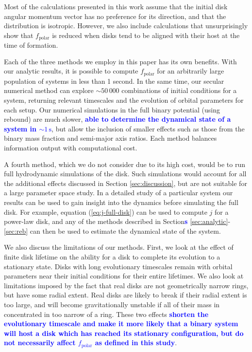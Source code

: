 \documentclass[twocolumn,linenumbers]{aastex631}
\newcommand{\RR}[1]{\textcolor{blue}{\bf#1}} %
\begin{document}
Most of the calculations presented in this work assume that the initial disk angular momentum vector has no preference for its direction, and that the distribution is isotropic. However, we also include calculations that unsurprisingly show that $f_\text{polar}$ is reduced when disks tend to be aligned with their host at the time of formation.

Each of the three methods we employ in this paper has its own benefits. With our analytic results, it is possible to compute $f_\text{polar}$ for an arbitrarily large population of systems in less than 1 second. In the same time, our secular numerical method can explore $\sim 50\,000$ combinations of initial conditions for a system, returning relevant timescales and the evolution of orbital parameters for each setup. Our numerical simulations in the full binary potential (using {\sc rebound}) are much slower, \RR{able to determine the dynamical state of a system in $\sim 1\,\text{s}$}, but allow the inclusion of smaller effects such as those from the binary mass fraction and semi-major axis ratios. Each method balances information output with computational cost.

A fourth method, which we do not consider due to its high cost, would be to run full hydrodynamic simulations of the disk. Such simulations would account for all the additional effects discussed in Section \ref{sec:discussion}, but are not suitable for a large parameter space study. In a detailed study of a particular system our results can be used to gain insight into the dynamics before simulating the full disk. For example, equation (\ref{eq:j-full-disk}) can be used to compute $j$ for a power-law disk, and any of the methods described in Section\RR{s} \ref{sec:analytic}-\ref{sec:reb} can then be used to estimate the dynamical state of the system.

We also discuss the limitations of our methods. First, we look at the effect of finite disk lifetime on the ability for a disk to complete its evolution to a stationary state. Disks with long evolutionary timescales remain with orbital parameters near their initial conditions for their entire lifetimes. We also look at limitations imposed by the fact that real disks are not geometrically narrow rings, but have some radial extent. Real disks are likely to break if their radial extent is too large, and will become gravitationally unstable if all of their mass in concentrated in too narrow of a ring. These two effects \RR{shorten the evolutionary timescale and make it more likely that a binary system will host a disk which has reached its stationary configuration, but do not necessarily affect $f_\text{polar}$ as defined in this study}.
\end{document}
